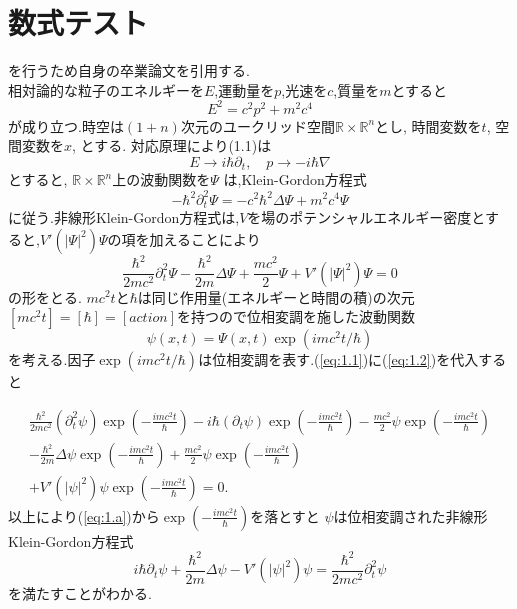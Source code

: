 \documentclass[a4j,12pt]{jreport}
\begin{document}
    \chapter{数式テスト}
        を行うため自身の卒業論文\cite{ohya}を引用する.\\
        相対論的な粒子のエネルギーを$E$,運動量を$p$,光速を$c$,質量を$m$とすると
        \begin{equation}
            E^2 = c^2 p^2 + m^2 c^4
        \end{equation}
        が成り立つ.時空は$(1+n)$次元のユークリッド空間$\mathbb{R} \times \mathbb{R}^n$とし, 時間変数を$t$, 空間変数を$x$, とする. 対応原理により(1.1)は\\
        \begin{equation}
            E \to i\hbar \partial_t, \quad p\to -i\hbar\nabla 
        \end{equation}
        とすると, $\mathbb{R} \times \mathbb{R}^n$上の波動関数を$\Psi$ は,Klein-Gordon方程式
        \begin{equation}
            -\hbar^2 \partial_t^2\Psi = -c^2\hbar^2\Delta \Psi + m^2c^4\Psi 
        \end{equation}
        に従う.非線形Klein-Gordon方程式は,$V$を場のポテンシャルエネルギー密度とすると,$V'(|\Psi|^2)\Psi$の項を加えることにより
        \begin{equation}
            \frac{\hbar^2}{2mc^2} \partial_t^2\Psi - \frac{\hbar^2}{2m}\Delta\Psi + \frac{mc^2}{2}\Psi 
            + V'( |\Psi|^2 )\Psi = 0  \label{eq:1.1}
        \end{equation}
        の形をとる. 
        $mc^2t$と$\hbar$は同じ作用量(エネルギーと時間の積)の次元$[mc^2t]=[\hbar]=[action]$を持つので位相変調を施した波動関数
        \begin{equation}
            \psi(x,t)=\Psi(x,t)\exp(imc^2t/\hbar) \label{eq:1.2}
        \end{equation}
        を考える.因子$\exp(imc^2t/\hbar)$は位相変調を表す.(\ref{eq:1.1})に(\ref{eq:1.2})を代入すると

        \begin{equation}
            \begin{split}
                \frac{\hbar^2}{2mc^2} (\partial_t^2 \psi) \exp(- \frac{imc^2t}{\hbar}) - i\hbar (\partial_t \psi) \exp(- \frac{imc^2t}{\hbar}) - \frac{mc^2}{2} \psi \exp(- \frac{imc^2t}{\hbar}) \\ 
                - \frac{\hbar^2}{2m}\Delta \psi \exp(- \frac{imc^2t}{\hbar}) + \frac{mc^2}{2} \psi \exp(- \frac{imc^2t}{\hbar}) \\
                + V'(|\psi|^2) \psi \exp(- \frac{imc^2t}{\hbar}) =0 .　\label{eq:1.a}
                \end{split}
        \end{equation}
        以上により(\ref{eq:1.a})から$\exp (- \frac{imc^2t}{\hbar})$を落とすと
        $\psi$は位相変調された非線形Klein-Gordon方程式
        \begin{equation}
            i\hbar \partial_t \psi + \frac{\hbar^2}{2m}\Delta \psi - V'(|\psi|^2)\psi 
            = \frac{\hbar^2}{2mc^2}\partial_t^2\psi \label{eq:1.3}
            \end{equation}
        を満たすことがわかる.
\end{document}
